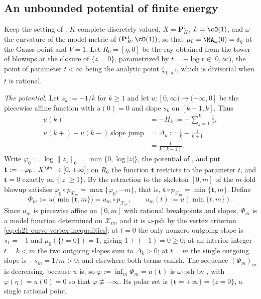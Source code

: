 \subsection{An unbounded potential of finite energy}
\label{sec:ch26-ex-unbounded}

\begin{example}
\label{ex:ch26-unbounded-finite-energy}
Keep the setting of : $K$ complete discretely
valued, $X=\mathbf P^1_K$, $L=\cO(1)$, and $\omega$ the curvature of
the model metric of $(\mathbf P^1_R,\cO(1))$, so that
$\mu_0=\MA_\omega(0)=\delta_\eta$ at the Gauss point and $V=1$.  Let
$R_0=[\eta,0]$ be the ray obtained from the tower of blowups at the closure
of $\{z=0\}$, parametrized by $t=-\log r\in[0,\infty)$, the point of parameter $t<\infty$ being the analytic point $\zeta_{0,|\pi|^t}$, which is divisorial when $t$ is rational.

\emph{The potential.}  Let $s_k:=-1/k$ for $k\geq1$ and let
$u:[0,\infty)\to(-\infty,0]$ be the piecewise affine function with
$u(0)=0$ and slope $s_k$ on $[k-1,k]$.  Thus
\[
 \begin{aligned}
 u(k)&=-H_k:=-\sum_{j=1}^k\frac1j,\\
 u(k+)-u(k-)\ \text{slope jump}
   &=\Delta_k:=\frac1k-\frac1{k+1}\\
   &=\frac1{k(k+1)} .
 \end{aligned}
\]
Write $\varphi_0:=\log\lVert z_1\rVert_0=\min\{0,\log|z|\}$, the potential
of , and put
$\mathbf t:=-\varphi_0:X^{\An}\to[0,+\infty]$; on $R_0$ the function
$\mathbf t$ restricts to the parameter $t$, and
$\mathbf t=0$ exactly on $\{|z|\geq1\}$.  By
 the retraction to the skeleton $[0,m]$ of the
$m$-fold blowup satisfies $\varphi_0\circ p_{\mathcal X_m}
=\max\{\varphi_0,-m\}$, that is,
$\mathbf t\circ p_{\mathcal X_m}=\min\{\mathbf t,m\}$.  Define
\[
 \Phi_m:=u\bigl(\min\{\mathbf t,m\}\bigr)
 =u_m\circ p_{\mathcal X_m},
 \qquad u_m(t):=u(\min\{t,m\}).
\]
Since $u_m$ is piecewise affine on $[0,m]$ with rational breakpoints and
slopes, $\Phi_m$ is a model function determined on $\mathcal X_m$, and it
is $\omega$-psh by the vertex criterion
\eqref{eq:ch21-curve-vertex-inequalities}: at $t=0$ the only nonzero
outgoing slope is $s_1=-1$ and $\mu_0(\{t=0\})=1$, giving
$1+(-1)=0\geq0$; at an interior integer $t=k<m$ the two outgoing slopes
sum to $\Delta_k>0$; at $t=m$ the single outgoing slope is
$-s_m=1/m>0$; and elsewhere both terms vanish.  The sequence
$(\Phi_m)_m$ is decreasing, because $u$ is, so
$\varphi:=\inf_m\Phi_m=u(\mathbf t)$ is $\omega$-psh by
, with
$\varphi(\eta)=u(0)=0$ so that $\varphi\not\equiv-\infty$.  Its polar set
is $\{\mathbf t=+\infty\}=\{z=0\}$, a single rational point.


\end{example}
